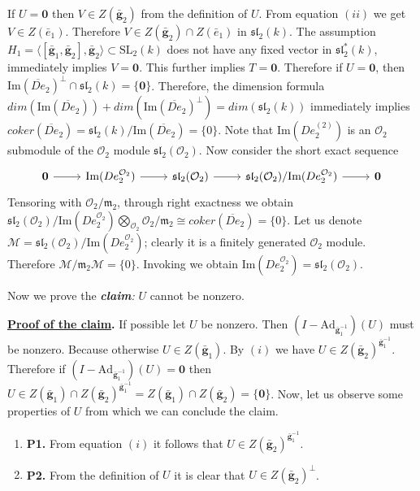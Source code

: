 \documentclass[10pt,twoside]{amsart}
\newcommand{\SL}{\mathrm{SL}}
\newcommand{\im}{\mathrm{Im}}
\newcommand{\R}{\mathcal{O}_2}
\theoremstyle{definition}
\theoremstyle{definition}
\begin{document}
If $U=\mathbf{0}$ then $V\in Z(\mathbf{\bar g}_2)$ from the definition of $U$. From equation $(ii)$ we get $V\in Z( \bar e_1)$. Therefore $V\in Z(\mathbf{\bar g}_2)\cap Z( \bar e_1) $ in $\mathfrak{sl}_2(k)$. The assumption $H_1 = \langle [\mathbf{\bar g}_1, \mathbf{\bar g}_2], \mathbf{\bar g}_2\rangle\subset \SL_2(k)$ does not have any fixed vector in $\mathfrak {sl}_2^*(k)$, immediately implies $V=\mathbf{0}$. This further implies $T=\mathbf{0}$. Therefore if $U=\mathbf{0}$, then $\im(\overline{De}_2)^\perp\cap \mathfrak{sl}_2(k)= \{\mathbf{0}\}$. Therefore, the dimension formula $dim(\im(\overline{De}_2))+dim(\im(\overline{De}_2)^\perp)=dim (\mathfrak{sl}_2(k))$ immediately implies $coker(\overline{De}_2)=\mathfrak{sl}_2(k)/\im(\overline{De}_2)=\{0\}$. Note that $\im(De^{(2)}_2)$ is an $\mathcal{O}_2$ submodule of the $\mathcal{O}_2$ module $\mathfrak{sl}_2(\mathcal{O}_2)$. Now consider the short exact sequence 
\[\begin{tikzcd}
	\mathbf{0} & {\im(De^{\R}_2)} & {\mathfrak{sl}_2(\mathcal{O}_2)} & {\mathfrak{sl}_2(\mathcal{O}_2)/\im(De^{\R}_2)} & \mathbf{0}
	\arrow[from=1-1, to=1-2]
	\arrow[from=1-2, to=1-3]
	\arrow[from=1-3, to=1-4]
	\arrow[from=1-4, to=1-5]
\end{tikzcd}\]
Tensoring with $\mathcal{O}_2/\mathfrak{m}_2$, through right exactness we obtain $\mathfrak{sl}_2(\mathcal{O}_2)/\im(De^{\R}_2)\bigotimes_{\mathcal{O}_2}\mathcal{O}_2/\mathfrak{m}_2\cong coker(\overline{De}_2)=\{0\}$. Let us denote $\mathcal{M}=\mathfrak{sl}_2(\mathcal{O}_2)/\im(De^{\R}_2)$; clearly it is a finitely generated $\mathcal{O}_2$ module. Therefore $\mathcal{M}/\mathfrak{m}_2\mathcal{M}=\{0\}$. Invoking \cite[proposition 2.6]{Atiyahmacdonald} we obtain $\im(De^{\R}_2)=\mathfrak{sl}_2(\mathcal{O}_2)$.

Now we prove the \emph{\textbf{claim}:} $U$ cannot be nonzero.

\noindent\textbf{\underline {Proof of the claim}.} If possible let $U$ be nonzero. Then $(I-\mathrm{Ad}_{\mathbf{\bar g}_1^{-1}})(U)$ must be nonzero. Because otherwise $U\in Z(\mathbf{\bar g}_1)$. By $(i)$ we have $U\in Z(\mathbf{\bar g}_2)^{\mathbf{\bar g}_1^{-1}}$. Therefore if $(I-\mathrm{Ad}_{\mathbf{\bar g}_1^{-1}})(U)=\mathbf{0}$ then $U\in Z(\mathbf{\bar g}_1)\cap Z(\mathbf{\bar g}_2)^{\mathbf{\bar g}_1^{-1}}=Z(\mathbf{\bar g}_1)\cap Z(\mathbf{\bar g}_2)=\{\mathbf{0}\}$. Now, let us observe some properties of $U$ from which we can conclude the claim.
\begin{enumerate}
\item\textbf{P1.} From equation $(i)$ it follows that $U\in Z(\mathbf{\bar g}_2)^{\mathbf{\bar g}_1^{-1}}$. 
    \item \textbf{P2.} From the definition of $U$ it is clear that $U\in Z(\mathbf{\bar g}_2)^{\perp}$. 
\end{enumerate}
\end{document}
